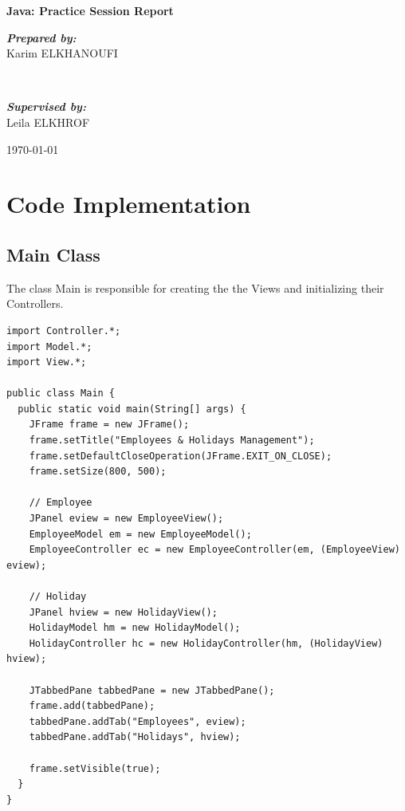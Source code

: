 \documentclass[12pt]{article}
\begin{document}
\begin{titlepage}
    \thispagestyle{empty}

        \vspace*{2cm}
        \Huge\textbf{\textcolor{centrale_red}{Java: Practice Session Report}} \\
        \vspace{1cm}
    
        \begin{minipage}{0.4\textwidth}
                \begin{flushleft} \large
                    \emph{\textbf{Prepared by:}}\\ 
                    Karim ELKHANOUFI
                \end{flushleft}
            \end{minipage}
            ~
            \begin{minipage}{0.4\textwidth}
                \begin{flushright} \large
					\emph{\textbf{Supervised by:}}\\
                    Leila ELKHROF
                \end{flushright}
            \end{minipage}

        \vfill
        \large{\today}
\end{titlepage}

\newpage

\tableofcontents

\newpage

\section{Code Implementation}

\subsection{Main Class}

The class Main is responsible for creating the the Views
and initializing their Controllers.

\begin{lstlisting}
import Controller.*;
import Model.*;
import View.*;

public class Main {
  public static void main(String[] args) {
    JFrame frame = new JFrame();
    frame.setTitle("Employees & Holidays Management");
    frame.setDefaultCloseOperation(JFrame.EXIT_ON_CLOSE);
    frame.setSize(800, 500);

    // Employee
    JPanel eview = new EmployeeView();
    EmployeeModel em = new EmployeeModel();
    EmployeeController ec = new EmployeeController(em, (EmployeeView) eview);

    // Holiday
    JPanel hview = new HolidayView();
    HolidayModel hm = new HolidayModel();
    HolidayController hc = new HolidayController(hm, (HolidayView) hview);

    JTabbedPane tabbedPane = new JTabbedPane();
    frame.add(tabbedPane);
    tabbedPane.addTab("Employees", eview);
    tabbedPane.addTab("Holidays", hview);

    frame.setVisible(true);
  }
}
\end{lstlisting}
\end{document}
